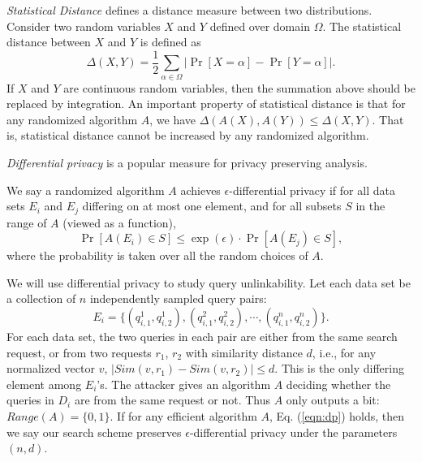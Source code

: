 \documentclass{IEEEtran}
\begin{document}
\emph{Statistical Distance} \cite{AB09,G95} defines a distance measure between two distributions. Consider two random variables $X$ and $Y$ defined over domain $\Omega$. The statistical distance between $X$ and $Y$ is defined as
$$\Delta(X,Y) = \frac{1}{2}\sum_{\alpha\in\Omega} |\Pr[X=\alpha] - \Pr[Y=\alpha]|.$$
If $X$ and $Y$ are continuous random variables, then the summation above should be replaced by integration.
An important property of statistical distance is that for any randomized algorithm $A$, we have $\Delta(A(X),A(Y))\leq\Delta(X,Y)$. That is, statistical distance cannot be increased by any randomized algorithm.

\emph{Differential privacy} \cite{Dwork08,DR14} is a popular measure for privacy preserving analysis. 
\begin{definition}
We say a randomized algorithm $A$ achieves $\epsilon$-differential privacy if for all data sets $E_i$ and $E_j$ differing on at most one element, and for all subsets $S$ in the range of $A$ (viewed as a function),
\begin{equation}
\label{eqn:dp}
\Pr[A(E_i) \in S] \leq \exp(\epsilon)\cdot \Pr[A(E_j)\in S],
\end{equation}
where the probability is taken over all the random choices of $A$.
\end{definition}
We will use differential privacy to study query unlinkability. Let each data set be a collection of $n$ independently sampled query pairs: 
$$E_i = \{(q_{i,1}^1, q_{i,2}^1), (q_{i,1}^2, q_{i,2}^2), \cdots, (q_{i,1}^n, q_{i,2}^n)\}.$$
For each data set, the two queries in each pair are either from the same search request, or from two requests $r_1$, $r_2$ with similarity distance $d$, i.e., for any normalized vector $v$, $|Sim(v,r_1) - Sim(v,r_2)| \leq d$. This is the only differing element among $E_i$'s. The attacker gives an algorithm $A$ deciding whether the queries in $D_i$ are from the same request or not. Thus $A$ only outputs a bit: $Range(A) = \{0,1\}$. If for any efficient algorithm $A$, Eq. (\ref{eqn:dp}) holds, then we say our search scheme preserves $\epsilon$-differential privacy under the parameters $(n, d)$.
\end{document}
